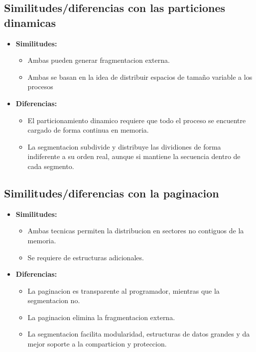 \documentclass[12pt]{article}
\begin{document}
\subsection{Similitudes/diferencias con las particiones dinamicas}
\begin{itemize}
    \item \textbf{Similitudes:}
\begin{itemize}
    \item Ambas pueden generar fragmentacion externa.
    \item Ambas se basan en la idea de distribuir espacios de tamaño variable a los procesos
\end{itemize}
\item \textbf{Diferencias:}
    \begin{itemize}
        \item El particionamiento dinamico requiere que todo el proceso se encuentre cargado de forma continua en memoria.
        \item La segmentacion subdivide y distribuye las dividiones de forma indiferente a su orden real, aunque si mantiene la secuencia dentro de cada segmento.
    \end{itemize}
\end{itemize}
\subsection{Similitudes/diferencias con la paginacion}
\begin{itemize}
    \item \textbf{Similitudes:}
\begin{itemize}
    \item Ambas tecnicas permiten la distribucion en sectores no contiguos de la memoria.
    \item Se requiere de estructuras adicionales.
\end{itemize}
\item \textbf{Diferencias:}
    \begin{itemize}
        \item La paginacion es transparente al programador, mientras que la segmentacion no.
        \item La paginacion elimina la fragmentacion externa.
        \item La segmentacion facilita modularidad, estructuras de datos grandes y da mejor soporte a la comparticion y proteccion.
    \end{itemize}
\end{itemize}
\end{document}

